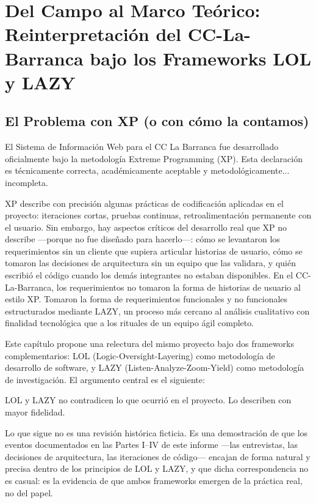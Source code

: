 \documentclass[14pt,a4paper,oneside]{extbook}
\begin{document}
\chapter{Del Campo al Marco Teórico: Reinterpretación del CC-La-Barranca bajo los Frameworks LOL y LAZY}

\section{ El Problema con XP (o con cómo la contamos)}

El Sistema de Información Web para el CC La Barranca fue desarrollado oficialmente bajo la metodología Extreme Programming (XP). Esta declaración es técnicamente correcta, académicamente aceptable y metodológicamente... incompleta.

XP describe con precisión algunas prácticas de codificación aplicadas en el proyecto: iteraciones cortas, pruebas continuas, retroalimentación permanente con el usuario. Sin embargo, hay aspectos críticos del desarrollo real que XP no describe ---porque no fue diseñado para hacerlo---: cómo se levantaron los requerimientos sin un cliente que supiera articular historias de usuario, cómo se tomaron las decisiones de arquitectura sin un equipo que las validara, y quién escribió el código cuando los demás integrantes no estaban disponibles. En el CC-La-Barranca, los requerimientos no tomaron la forma de historias de usuario al estilo XP. Tomaron la forma de requerimientos funcionales y no funcionales estructurados mediante LAZY, un proceso más cercano al análisis cualitativo con finalidad tecnológica que a los rituales de un equipo ágil completo.

Este capítulo propone una relectura del mismo proyecto bajo dos frameworks complementarios: LOL (Logic-Oversight-Layering) como metodología de desarrollo de software, y LAZY (Listen-Analyze-Zoom-Yield) como metodología de investigación. El argumento central es el siguiente:

LOL y LAZY no contradicen lo que ocurrió en el proyecto. Lo describen con mayor fidelidad.

Lo que sigue no es una revisión histórica ficticia. Es una demostración de que los eventos documentados en las Partes I--IV de este informe ---las entrevistas, las decisiones de arquitectura, las iteraciones de código--- encajan de forma natural y precisa dentro de los principios de LOL y LAZY, y que dicha correspondencia no es casual: es la evidencia de que ambos frameworks emergen de la práctica real, no del papel.
\end{document}
